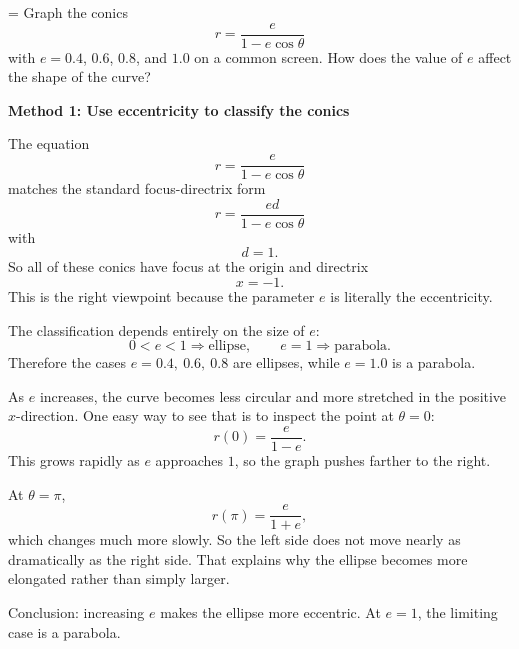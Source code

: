 \documentclass[a4paper,12pt,twocolumn]{article}
\newlength{\problemnumberwidth}
\newenvironment{solutionbox}{\begin{framed}}{\end{framed}}
\newcommand{\problem}[3]{%
  \Needspace{10\baselineskip}%
  \phantomsection\label{#1}%
  \par\vspace{0.8em}%
  \noindent
  \hangindent=\problemnumberwidth
  \hangafter=1
  \makebox[\problemnumberwidth][l]{\textbf{#2.}}#3\par
}
\begin{document}
\problem{prob:10-6-25}{25}{Graph the conics
\[
r=\frac{e}{1-e\cos\theta}
\]
with \(e=0.4\), \(0.6\), \(0.8\), and \(1.0\) on a common screen. How does the value of \(e\) affect the shape of the curve?}

\begin{solutionbox}
\textbf{Method 1: Use eccentricity to classify the conics}

\begin{steps}
\item The equation
\[
r=\frac{e}{1-e\cos\theta}
\]
matches the standard focus-directrix form
\[
r=\frac{ed}{1-e\cos\theta}
\]
with
\[
d=1.
\]
So all of these conics have focus at the origin and directrix
\[
x=-1.
\]
This is the right viewpoint because the parameter \(e\) is literally the eccentricity.

\item The classification depends entirely on the size of \(e\):
\[
0<e<1 \Longrightarrow \text{ellipse},
\qquad
e=1 \Longrightarrow \text{parabola}.
\]
Therefore the cases \(e=0.4,\ 0.6,\ 0.8\) are ellipses, while \(e=1.0\) is a parabola.

\item As \(e\) increases, the curve becomes less circular and more stretched in the positive \(x\)-direction. One easy way to see that is to inspect the point at \(\theta=0\):
\[
r(0)=\frac{e}{1-e}.
\]
This grows rapidly as \(e\) approaches \(1\), so the graph pushes farther to the right.

\item At \(\theta=\pi\),
\[
r(\pi)=\frac{e}{1+e},
\]
which changes much more slowly. So the left side does not move nearly as dramatically as the right side. That explains why the ellipse becomes more elongated rather than simply larger.

\item Conclusion: increasing \(e\) makes the ellipse more eccentric. At \(e=1\), the limiting case is a parabola.
\end{steps}
\end{solutionbox}
\end{document}
